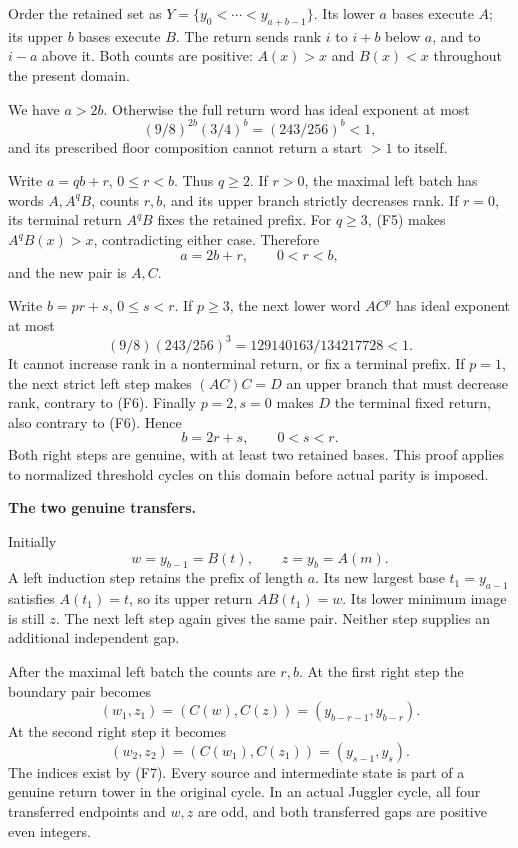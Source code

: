\documentclass[12pt]{article}
\begin{document}
Order the retained set as \(Y=\{y_0<\cdots<y_{a+b-1}\}\). Its lower
\(a\) bases execute \(A\); its upper \(b\) bases execute \(B\). The
return sends rank \(i\) to \(i+b\) below \(a\), and to \(i-a\) above it.
Both counts are positive: \(A(x)>x\) and \(B(x)<x\) throughout the
present domain.

We have \(a>2b\). Otherwise the full return word has ideal exponent at
most \[
(9/8)^{2b}(3/4)^b=(243/256)^b<1,
\] and its prescribed floor composition cannot return a start \(>1\) to
itself.

Write \(a=qb+r\), \(0\le r<b\). Thus \(q\ge2\). If \(r>0\), the maximal
left batch has words \(A,A^qB\), counts \(r,b\), and its upper branch
strictly decreases rank. If \(r=0\), its terminal return \(A^qB\) fixes
the retained prefix. For \(q\ge3\), (F5) makes \(A^qB(x)>x\),
contradicting either case. Therefore \[
a=2b+r,\qquad 0<r<b,
\] and the new pair is \(A,C\).

Write \(b=pr+s\), \(0\le s<r\). If \(p\ge3\), the next lower word
\(AC^p\) has ideal exponent at most \[
(9/8)(243/256)^3=129140163/134217728<1.
\] It cannot increase rank in a nonterminal return, or fix a terminal
prefix. If \(p=1\), the next strict left step makes \((AC)C=D\) an upper
branch that must decrease rank, contrary to (F6). Finally \(p=2,s=0\)
makes \(D\) the terminal fixed return, also contrary to (F6). Hence \[
b=2r+s,\qquad 0<s<r.
\tag{F7}
\] Both right steps are genuine, with at least two retained bases. This
proof applies to normalized threshold cycles on this domain before
actual parity is imposed.

\textbf{The two genuine transfers.}

Initially \[
w=y_{b-1}=B(t),\qquad z=y_b=A(m).
\] A left induction step retains the prefix of length \(a\). Its new
largest base \(t_1=y_{a-1}\) satisfies \(A(t_1)=t\), so its upper return
\(AB(t_1)=w\). Its lower minimum image is still \(z\). The next left
step again gives the same pair. Neither step supplies an additional
independent gap.

After the maximal left batch the counts are \(r,b\). At the first right
step the boundary pair becomes \[
(w_1,z_1)=(C(w),C(z))
 =(y_{b-r-1},y_{b-r}).
\] At the second right step it becomes \[
(w_2,z_2)=(C(w_1),C(z_1))
 =(y_{s-1},y_s).
\] The indices exist by (F7). Every source and intermediate state is
part of a genuine return tower in the original cycle. In an actual
Juggler cycle, all four transferred endpoints and \(w,z\) are odd, and
both transferred gaps are positive even integers.
\end{document}
